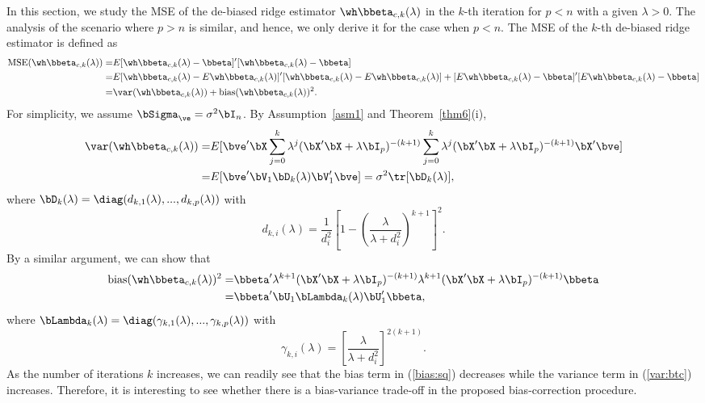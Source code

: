 In this section, we study the MSE of the de-biased ridge estimator $\wh\bbeta_{c,k}(\lambda)$ in the $k$-th iteration  for $p<n$ with a given $\lambda>0$. The analysis of the scenario where $p>n$ is similar, and hence, we only derive it for the case when $p<n$. The MSE of the $k$-th de-biased ridge estimator is defined as 
\begin{align}\label{mse:bt}
    \text{MSE}(\wh\bbeta_{c,k}(\lambda))=&E[\wh\bbeta_{c,k}(\lambda)-\bbeta]'[\wh\bbeta_{c,k}(\lambda)-\bbeta]\notag\\
    =&E[\wh\bbeta_{c,k}(\lambda)-E\wh\bbeta_{c,k}(\lambda)]'[\wh\bbeta_{c,k}(\lambda)-E\wh\bbeta_{c,k}(\lambda)]+[E\wh\bbeta_{c,k}(\lambda)-\bbeta]'[E\wh\bbeta_{c,k}(\lambda)-\bbeta]\notag\\
    =&\var(\wh\bbeta_{c,k}(\lambda))+\text{bias}(\wh\bbeta_{c,k}(\lambda))^2.
\end{align}
For simplicity, we assume $\bSigma_\ve=\sigma^2\bI_n$. By Assumption~\ref{asm1} and Theorem~\ref{thm6}(i),
\begin{align}\label{var:btc}
    \var({\wh\bbeta_{c,k}(\lambda)})=&E[\bve'\bX\sum_{j=0}^k\lambda^j(\bX'\bX+\lambda\bI_p)^{-(k+1)}\sum_{j=0}^k\lambda^j(\bX'\bX+\lambda\bI_p)^{-(k+1)}\bX'\bve]\notag\\
    =&E[\bve'\bV_1\bD_{k}(\lambda)\bV_1'\bve]=\sigma^2\tr[\bD_{k}(\lambda)],
\end{align}
where $\bD_{k}(\lambda)=\diag(d_{k,1}(\lambda),...,d_{k,p}(\lambda))$ with
\[d_{k,i}(\lambda)=\frac{1}{d_i^2}\left[1-(\frac{\lambda}{\lambda+d_i^2})^{k+1}\right]^2.\]
By a similar argument, we can show that
\begin{align}\label{bias:sq}
 \text{bias}(\wh\bbeta_{c,k}(\lambda))^2=&  \bbeta'\lambda^{k+1}(\bX'\bX+\lambda\bI_p)^{-(k+1)}\lambda^{k+1}(\bX'\bX+\lambda\bI_p)^{-(k+1)}\bbeta\notag\\
 =&\bbeta'\bU_1\bLambda_{k}(\lambda)\bU_1'\bbeta,
\end{align}
where $\bLambda_{k}(\lambda)=\diag(\gamma_{k,1}(\lambda),...,\gamma_{k,p}(\lambda))$ with
\[\gamma_{k,i}(\lambda)=[\frac{\lambda}{\lambda+d_i^2}]^{2(k+1)}.\]
As the number of iterations $k$ increases, we can readily see that the bias term in (\ref{bias:sq}) decreases while the variance term in (\ref{var:btc}) increases. Therefore, it is interesting to see whether there is a bias-variance trade-off in the proposed bias-correction procedure. 

